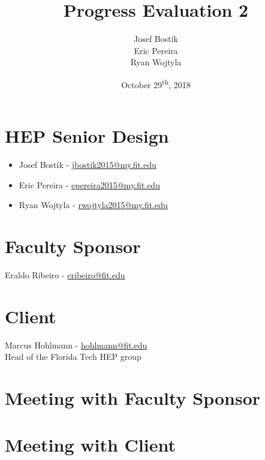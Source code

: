 \documentclass[12pt]{article}
\newcommand\tab[1][1cm]{\hspace*{#1}}
\begin{document}
\begin{titlepage}
	
\author{Josef Bostik\\
	Eric Pereira\\
	Ryan Wojtyla\\}
\date{October 29\textsuperscript{th}, 2018}
\title{Progress Evaluation 2}

\maketitle

\end{titlepage}

\tableofcontents

\newpage {}

\section{HEP Senior Design}

\begin{itemize}
	\item Josef Bostik - \href{mailto:jbostik2015@my.fit.edu}{jbostik2015@my.fit.edu}
	\item Eric Pereira - \href{mailto:epereira2015@my.fit.edu}{epereira2015@my.fit.edu }
	\item Ryan Wojtyla - \href{mailto:rwojtyla2015@my.fit.edu}{rwojtyla2015@my.fit.edu}
\end{itemize}

\section{Faculty Sponsor}

\tab Eraldo Ribeiro - \href{mailto:eribeiro@fit.edu}{eribeiro@fit.edu}

\section{Client}

\tab Marcus Hohlmann - \href{mailto:hohlmann@fit.edu}{hohlmann@fit.edu} \\ 
\tab Head of the Florida Tech HEP group

\section{Meeting with Faculty Sponsor}

\section{Meeting with Client}
\end{document}
